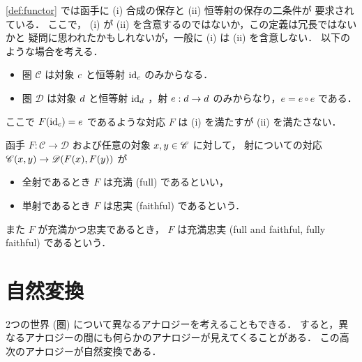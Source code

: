 \documentclass[titlepage]{ltjsreport}
\newcommand{\cat}[1]{\mathscr{#1}}
\newcommand{\obj}[1]{\lowercase{#1}}
\newcommand{\objs}[1]{#1}
\newcommand{\mrp}[3]{{#1}:{#2}\to{#3}}
\newcommand{\mrps}[3]{#1(#2,#3)}
\newcommand{\id}[1]{\mathrm{id}_{#1}}
\begin{document}
\begin{shadebox}
  \def\C{\cat{C}}%
  \def\D{\cat{D}}%
  \def\c{\obj{c}}%
  \def\d{\obj{d}}%
  \def\e{e}%
  \def\F{F}%
  \cref{def:functor} では函手に (i) 合成の保存と (ii) 恒等射の保存の二条件が
  要求されている．
  ここで， (i) が (ii) を含意するのではないか，この定義は冗長ではないかと
  疑問に思われたかもしれないが，一般に (i) は (ii) を含意しない．
  以下のような場合を考える．
  \begin{itemize}
    \item 圏 $\C$ は対象 $\c$ と恒等射 $\id{\c}$ のみからなる．
    \item 圏 $\D$ は対象 $\d$ と恒等射 $\id{\d}$ ，射 $\mrp{e}{\d}{\d}$
          のみからなり，$\e=\e\circ\e$ である．
  \end{itemize}
  ここで $\F(\id{\c})=\e$ であるような対応 $\F$ は
  (i) を満たすが (ii) を満たさない．
\end{shadebox}

\begin{definition}[充満，忠実，充満忠実]\label{def:full-faithful}
  \def\C{\cat{C}}%
  \def\D{\cat{D}}%
  \def\x{\obj{x}}%
  \def\y{\obj{y}}%
  函手 $\mrp{F}{\C}{\D}$ および任意の対象 $\x,\y\in\objs{\C}$ に対して，
  射についての対応 $\mrps{\C}{\x}{\y}\to\mrps{\D}{F(\x)}{F(\y)}$ が
  \begin{itemize}
    \item 全射であるとき $F$ は充満 (full) であるといい，
    \item 単射であるとき $F$ は忠実 (faithful) であるという．
  \end{itemize}
  また $F$ が充満かつ忠実であるとき，
  $F$ は充満忠実 (full and faithful, fully faithful) であるという．
\end{definition}

\section{自然変換}

2つの世界 (圏) について異なるアナロジーを考えることもできる．
すると，異なるアナロジーの間にも何らかのアナロジーが見えてくることがある．
この高次のアナロジーが自然変換である．
\end{document}
